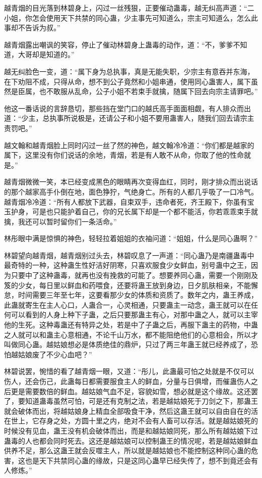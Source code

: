 越青烟的目光落到林碧身上，闪过一丝残狠，正要催动蛊毒，越无纠高声道：“二小姐，你怎会使用天下共禁的同心蛊，少主事先可知道么，宗主可知道么，怎么此事却不告诉为叔。”

越青烟露出嘲讽的笑容，停止了催动林碧身上蛊毒的动作，道：“不，爹爹不知道，大哥却是知道的。”

越无纠脸色一变，道：“属下身为总执事，真是无能失职，少宗主有意吞并东海，在下劝阻不成，只得从命，想不到公子竟然和小姐串通，使用同心蛊害人，属下虽然是臣属，也不敢服从乱命，公子小姐不若束手就擒，随属下回去向宗主请罪吧。”

他这一番话说的言辞恳切，那些挡在堂门口的越氏高手面面相觑，有人排众而出道：“少主，总执事所说极是，还请公子和小姐不要用蛊害人，随我们回去请宗主责罚吧。”

越文翰和越青烟脸上同时闪过一丝了然的神色，越文翰冷冷道：“你们都是越家的属下，这里没有你们说话的余地，青烟，若是有人敢不从命，你取了他的性命就是。”

越青烟微微一笑，本已经变成黑色的眼睛再次变得血红，同时，刚才排众而出说话的那个越家高手仆倒在地，面色狰狞，气绝身亡。所有的人都几乎吸了一口冷气。越青烟冷冷道：“所有人都放下武器，自束双手，违命者死，齐王殿下，你虽有宝玉护身，可是也只能护着自己，你的兄长属下却是一个都不能活，你若乖乖束手就擒，我还可以暂时留你们一条活命。”

林彤眼中满是惊惧的神色，轻轻拉着姐姐的衣袖问道：“姐姐，什么是同心蛊啊？”

林碧望向越青烟，越青烟别过头去，林碧叹息了一声道：“同心蛊乃是南疆蛊毒中最奇特的一种，这种蛊生性好洁好阴寒，只喜欢服食少女鲜血，别号蛊中之王，因为只要中了这种蛊毒，就再也没有挽救的可能了。想要养同心蛊，需要一个刚刚及笈的少女，每日里以鲜血和药喂食，还要将蛊王放到身边，日夕肌肤相亲，不能懈怠，时间需要三年至七年，这要看那少女的体质和资质了。数年之内，蛊王养成，此蛊就寄生在主人心口，人蛊合一，心灵相通，只要蛊主一动念，蛊王就可以在任何可以看到的人身上种下子蛊，之后只要那蛊主有心，对那中蛊之人，就可以主宰他的生死。这种毒蛊还有特异之处，若是中了子蛊之后，再服下蛊主的药物，中蛊之人就可以和蛊主心意相通，不论千山万水，都不能阻绝他们的心意相会，所以才叫做同心蛊。越姑娘想必是体质绝佳的鼎炉，只过了两三年蛊王就已经养成了，恐怕越姑娘废了不少心血吧？”

林碧说罢，惋惜的看了越青烟一眼，又道：“彤儿，此蛊最可怕之处就是不仅可以伤人，还会伤己，此蛊每日都需要服食主人的鲜血，分量与日俱增，而催蛊伤人之后更是需要数倍的鲜血。越姑娘气血不足，容貌如雪，想必就是这个缘故。这还罢了，要知道蛊毒虽然可怕，可是还有克制之法，若是越姑娘死于刀剑之下，那蛊王就会破体而出，将越姑娘身上精血全部吸食干净，然后这蛊王就可以自由自在的活在世上，它存身之处，方圆十里之内，绝对不会有人畜可以存活。就是越姑娘死的时候没有见血，蛊王没有机会破体而出，而是和越姑娘同死，那么所有越姑娘下过蛊毒的人也都会同时死去。这还是越姑娘可以控制蛊王的情况呢，若是越姑娘鲜血供养不足，那么这蛊王就会反噬主人，所以就是越姑娘也不能控制这种同心蛊的危害，这也是天下共禁同心蛊的缘故，只是这同心蛊早已经失传了，想不到竟还会有人修炼。”


